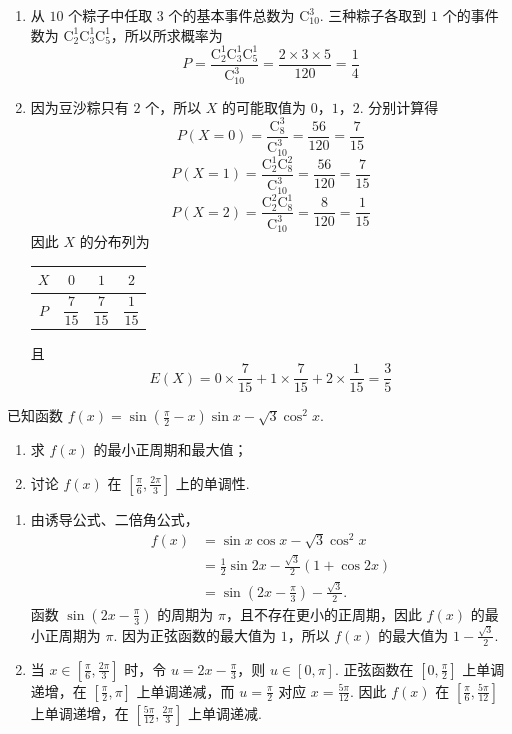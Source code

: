 \begin{solution}
\begin{enumerate}
\item 从 \(10\) 个粽子中任取 \(3\) 个的基本事件总数为 \(\mathrm C_{10}^{3}\). 三种粽子各取到 \(1\) 个的事件数为 \(\mathrm C_2^1\mathrm C_3^1\mathrm C_5^1\)，所以所求概率为
\[
P=\frac{\mathrm C_2^1\mathrm C_3^1\mathrm C_5^1}{\mathrm C_{10}^{3}}=\frac{2\times3\times5}{120}=\frac14
\]
\item 因为豆沙粽只有 \(2\) 个，所以 \(X\) 的可能取值为 \(0\)，\(1\)，\(2\). 分别计算得
\[
P(X=0)=\frac{\mathrm C_8^3}{\mathrm C_{10}^{3}}=\frac{56}{120}=\frac{7}{15}
\]
\[
P(X=1)=\frac{\mathrm C_2^1\mathrm C_8^2}{\mathrm C_{10}^{3}}=\frac{56}{120}=\frac{7}{15}
\]
\[
P(X=2)=\frac{\mathrm C_2^2\mathrm C_8^1}{\mathrm C_{10}^{3}}=\frac{8}{120}=\frac{1}{15}
\]
因此 \(X\) 的分布列为
\begin{center}
\begin{tabular}{c|ccc}
\(X\) & \(0\) & \(1\) & \(2\) \\
\hline
\(P\) & \(\dfrac{7}{15}\) & \(\dfrac{7}{15}\) & \(\dfrac{1}{15}\)
\end{tabular}
\end{center}
且
\[
E(X)=0\times\frac{7}{15}+1\times\frac{7}{15}+2\times\frac{1}{15}=\frac35
\]
\end{enumerate}
\end{solution}

\begin{problem}
已知函数 \( f(x) = \sin \left( \frac{\pi}{2} - x \right) \sin x - \sqrt{3} \cos^2 x \).

\begin{enumerate}
\item 求 \( f(x) \) 的最小正周期和最大值；
\item 讨论 \( f(x) \) 在 \( \left[\frac{\pi}{6}, \frac{2\pi}{3}\right] \) 上的单调性.
\end{enumerate}
\end{problem}

\begin{solution}
\begin{enumerate}
\item 由诱导公式、二倍角公式，
\[
\begin{split}
f(x)&=\sin x\cos x-\sqrt3\cos^2x\\
&=\frac12\sin2x-\frac{\sqrt3}{2}(1+\cos2x)\\
&=\sin\left(2x-\frac\pi3\right)-\frac{\sqrt3}{2}.
\end{split}
\]
函数 \(\sin(2x-\frac\pi3)\) 的周期为 \(\pi\)，且不存在更小的正周期，因此 \(f(x)\) 的最小正周期为 \(\pi\). 因为正弦函数的最大值为 \(1\)，所以 \(f(x)\) 的最大值为 \(1-\frac{\sqrt3}{2}\).
\item 当 \(x\in\left[\frac\pi6,\frac{2\pi}{3}\right]\) 时，令 \(u=2x-\frac\pi3\)，则 \(u\in[0,\pi]\). 正弦函数在 \([0,\frac\pi2]\) 上单调递增，在 \([\frac\pi2,\pi]\) 上单调递减，而 \(u=\frac\pi2\) 对应 \(x=\frac{5\pi}{12}\). 因此 \(f(x)\) 在 \(\left[\frac\pi6,\frac{5\pi}{12}\right]\) 上单调递增，在 \(\left[\frac{5\pi}{12},\frac{2\pi}{3}\right]\) 上单调递减.
\end{enumerate}
\end{solution}

